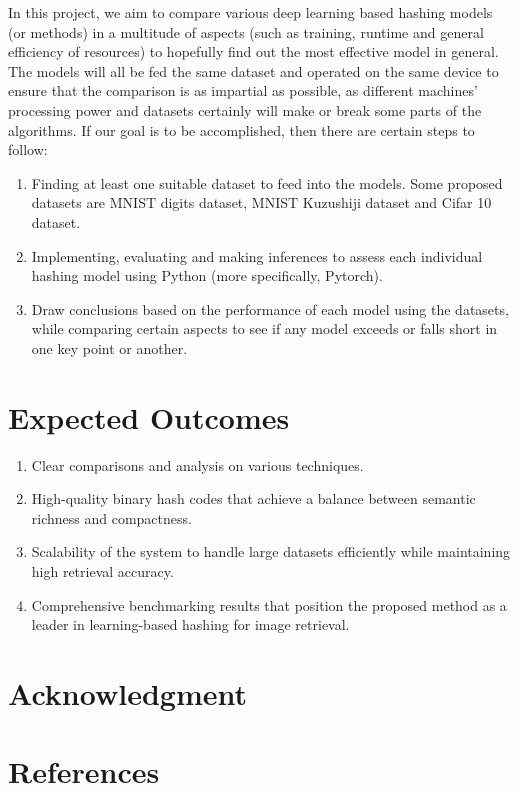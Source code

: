\documentclass[conference]{IEEEtran}
\begin{document}
In this project, we aim to compare various deep learning based hashing models (or methods) in a multitude of aspects (such as training, runtime and general efficiency of resources) to hopefully find out the most effective model in general.
The models will all be fed the same dataset and operated on the same device to ensure that the comparison is as impartial as possible, as different machines’ processing power and datasets certainly will make or break some parts of the algorithms.
If our goal is to be accomplished, then there are certain steps to follow:
\begin{enumerate}
    \item Finding at least one suitable dataset to feed into the models. Some proposed datasets are MNIST digits dataset, MNIST Kuzushiji dataset and Cifar 10 dataset.
    \item Implementing, evaluating and making inferences to assess each individual hashing model using Python (more specifically, Pytorch).
    \item Draw conclusions based on the performance of each model using the datasets, while comparing certain aspects to see if any model exceeds or falls short in one key point or another.
    
\end{enumerate}

\section{Expected Outcomes}

\begin{enumerate}
    \item Clear comparisons and analysis on various techniques.
    \item High-quality binary hash codes that achieve a balance between semantic richness and compactness.
    \item Scalability of the system to handle large datasets efficiently while maintaining high retrieval accuracy.
    \item Comprehensive benchmarking results that position the proposed method as a leader in learning-based hashing for image retrieval.
    
\end{enumerate}
\section*{Acknowledgment}

\section*{References}
\end{document}
